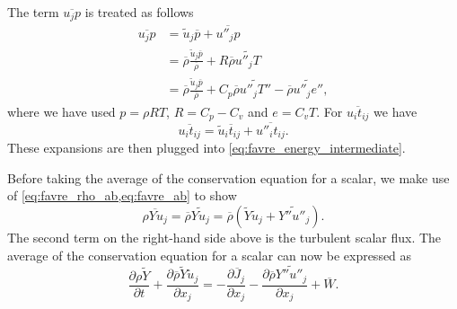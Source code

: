 \documentclass[oneside,a4paper,11pt]{report}
\newcommand{\rhoavg}{\overline{\rho}}
\newcommand{\pavg}{\overline{p}}
\newcommand{\tavg}{\overline{t}}
\newcommand{\Javg}{\overline{J}}
\newcommand{\Wavg}{\overline{W}}
\newcommand{\uavgf}{\widetilde{u}}
\newcommand{\Yavgf}{\widetilde{Y}}
\newcommand{\eflucf}{e''}
\newcommand{\Yflucf}{Y''}
\newcommand{\Tflucf}{T''}
\newcommand{\uflucf}{u''}
\begin{document}
The term $\overline{u_j p}$ is treated as follows
\begin{align}
\overline{ u_j p } &= \uavgf_j \pavg  + \overline{ \uflucf_j p } \nonumber \\ 
&= \rhoavg \frac { \uavgf_j \pavg}{\rhoavg} + R \rhoavg \widetilde{ \uflucf_j T } \nonumber \\
&= \rhoavg \frac{ \uavgf_j \pavg }{\rhoavg} + C_p \rhoavg \widetilde{ \uflucf_j \Tflucf } - \rhoavg \widetilde{ \uflucf_j \eflucf } \label{eq:puj_expansion} ,
\end{align}
where we have used $p = \rho R T$, $R = C_p - C_v$ and $e = C_v T$. For $\overline{ u_i t_{ij} }$ we have
\begin{equation}
\label{eq:tuj_expansion}
\overline{ u_i t_{ij} } = \uavgf_i \tavg_{ij} + \overline{ \uflucf_i t_{ij} }. 
\end{equation}
These expansions are then plugged into \cref{eq:favre_energy_intermediate}. 

Before taking the average of the conservation equation for a scalar, we make use of \cref{eq:favre_rho_ab,eq:favre_ab} to show
\begin{equation}
\label{eq:scalar_flux_expansion}
    \overline{ \rho Y u_j } = \rhoavg \widetilde{Y u_j} = \rhoavg \left ( \Yavgf \uavgf_j + \widetilde{\Yflucf \uflucf_j} \right).
\end{equation}
The second term on the right-hand side above is the turbulent scalar flux. The average of the conservation equation for a scalar can now be expressed as
\begin{equation}
    \frac{\partial \rho \Yavgf}{\partial t} + \frac{\partial \rhoavg \Yavgf \uavgf_j}{\partial x_j} = -\frac{ \partial \Javg_j }{ \partial x_j } - \frac{ \partial \rhoavg \widetilde{\Yflucf \uflucf_j} }{ \partial x_j } + \Wavg.
\end{equation}
\end{document}
